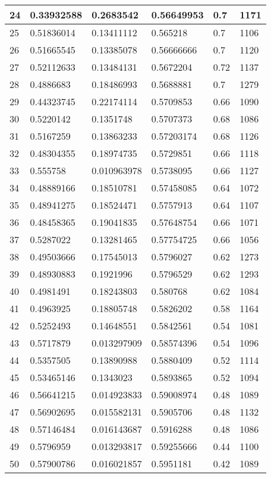 \begin{longtable}{|l|l|l|l|l|l|}
24 & 0.33932588 & 0.2683542 & 0.56649953 & 0.7 & 1171 \\ \hline 
25 & 0.51836014 & 0.13411112 & 0.565218 & 0.7 & 1106 \\ \hline 
26 & 0.51665545 & 0.13385078 & 0.56666666 & 0.7 & 1120 \\ \hline 
27 & 0.52112633 & 0.13484131 & 0.5672204 & 0.72 & 1137 \\ \hline 
28 & 0.4886683 & 0.18486993 & 0.5688881 & 0.7 & 1279 \\ \hline 
29 & 0.44323745 & 0.22174114 & 0.5709853 & 0.66 & 1090 \\ \hline 
30 & 0.5220142 & 0.1351748 & 0.5707373 & 0.68 & 1086 \\ \hline 
31 & 0.5167259 & 0.13863233 & 0.57203174 & 0.68 & 1126 \\ \hline 
32 & 0.48304355 & 0.18974735 & 0.5729851 & 0.66 & 1118 \\ \hline 
33 & 0.555758 & 0.010963978 & 0.5738095 & 0.66 & 1127 \\ \hline 
34 & 0.48889166 & 0.18510781 & 0.57458085 & 0.64 & 1072 \\ \hline 
35 & 0.48941275 & 0.18524471 & 0.5757913 & 0.64 & 1107 \\ \hline 
36 & 0.48458365 & 0.19041835 & 0.57648754 & 0.66 & 1071 \\ \hline 
37 & 0.5287022 & 0.13281465 & 0.57754725 & 0.66 & 1056 \\ \hline 
38 & 0.49503666 & 0.17545013 & 0.5796027 & 0.62 & 1273 \\ \hline 
39 & 0.48930883 & 0.1921996 & 0.5796529 & 0.62 & 1293 \\ \hline 
40 & 0.4981491 & 0.18243803 & 0.580768 & 0.62 & 1084 \\ \hline 
41 & 0.4963925 & 0.18805748 & 0.5826202 & 0.58 & 1164 \\ \hline 
42 & 0.5252493 & 0.14648551 & 0.5842561 & 0.54 & 1081 \\ \hline 
43 & 0.5717879 & 0.013297909 & 0.58574396 & 0.54 & 1096 \\ \hline 
44 & 0.5357505 & 0.13890988 & 0.5880409 & 0.52 & 1114 \\ \hline 
45 & 0.53465146 & 0.1343023 & 0.5893865 & 0.52 & 1094 \\ \hline 
46 & 0.56641215 & 0.014923833 & 0.59008974 & 0.48 & 1089 \\ \hline 
47 & 0.56902695 & 0.015582131 & 0.5905706 & 0.48 & 1132 \\ \hline 
48 & 0.57146484 & 0.016143687 & 0.5916288 & 0.48 & 1086 \\ \hline 
49 & 0.5796959 & 0.013293817 & 0.59255666 & 0.44 & 1100 \\ \hline 
50 & 0.57900786 & 0.016021857 & 0.5951181 & 0.42 & 1089 \\ \hline 
\end{longtable}